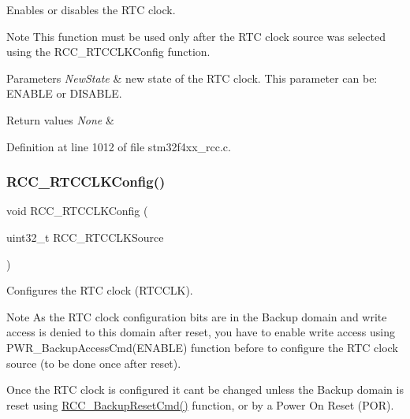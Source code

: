 Enables or disables the R\+TC clock. 

\begin{DoxyNote}{Note}
This function must be used only after the R\+TC clock source was selected using the R\+C\+C\+\_\+\+R\+T\+C\+C\+L\+K\+Config function. 
\end{DoxyNote}

\begin{DoxyParams}{Parameters}
{\em New\+State} & new state of the R\+TC clock. This parameter can be\+: E\+N\+A\+B\+LE or D\+I\+S\+A\+B\+LE. \\
\hline
\end{DoxyParams}

\begin{DoxyRetVals}{Return values}
{\em None} & \\
\hline
\end{DoxyRetVals}


Definition at line 1012 of file stm32f4xx\+\_\+rcc.\+c.

\mbox{\label{group___r_c_c_ga1473d8a5a020642966359611c44181b0}} 
\subsubsection{\texorpdfstring{R\+C\+C\+\_\+\+R\+T\+C\+C\+L\+K\+Config()}{RCC\_RTCCLKConfig()}}
{\footnotesize\ttfamily void R\+C\+C\+\_\+\+R\+T\+C\+C\+L\+K\+Config (\begin{DoxyParamCaption}\item[{uint32\+\_\+t}]{R\+C\+C\+\_\+\+R\+T\+C\+C\+L\+K\+Source }\end{DoxyParamCaption})}



Configures the R\+TC clock (R\+T\+C\+C\+LK). 

\begin{DoxyNote}{Note}
As the R\+TC clock configuration bits are in the Backup domain and write access is denied to this domain after reset, you have to enable write access using P\+W\+R\+\_\+\+Backup\+Access\+Cmd(\+E\+N\+A\+B\+L\+E) function before to configure the R\+TC clock source (to be done once after reset). 

Once the R\+TC clock is configured it can\textquotesingle{}t be changed unless the Backup domain is reset using \hyperlink{group___r_c_c___group3_ga636c3b72f35391e67f12a551b15fa54a}{R\+C\+C\+\_\+\+Backup\+Reset\+Cmd()} function, or by a Power On Reset (P\+OR).
\end{DoxyNote}

